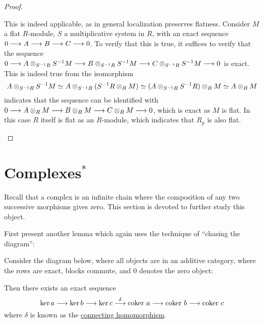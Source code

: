 \begin{proof}
\begin{enumerate}
        This is indeed applicable, as in general localization preserves flatness. Consider $M$ a flat $R$-module, $S$ a multiplicative system in $R$, with an exact sequence $0 \longrightarrow A \longrightarrow B \longrightarrow C \longrightarrow 0$. To verify that this is true, it suffices to verify that the sequence $0 \longrightarrow A \otimes_{S^{-1}R} S^{-1}M \longrightarrow B \otimes_{S^{-1}R} S^{-1}M \longrightarrow C \otimes_{S^{-1}R} S^{-1}M \longrightarrow 0$ is exact. This is indeed true from the isomorphism 
        \[
            A \otimes_{S^{-1}R} S^{-1}M \simeq A \otimes_{S^{-1}R} (S^{-1}R \otimes_R M) \simeq (A \otimes_{S^{-1}R} S^{-1}R) \otimes_R M \simeq A \otimes_R M
        \]
        indicates that the sequence can be identified with $0 \longrightarrow A \otimes_R M \longrightarrow B \otimes_R M \longrightarrow C \otimes_R M \longrightarrow 0$, which is exact as $M$ is flat. In this case $R$ itself is flat as an $R$-module, which indicates that $R_p$ is also flat.
    \end{enumerate}

\end{proof}

\section{Complexes$^*$}

Recall that a complex is an infinite chain where the composition of any two successive morphisms gives zero. This section is devoted to further study this object.

First present another lemma which again uses the technique of ``chasing the diagram'':

\begin{proposition}
    Consider the diagram below, where all objects are in an additive category, where the rows are exact, blocks commute, and $0$ denotes the zero object: 
    \begin{figure}[htbp]
        \centering
    \end{figure}

    Then there exists an exact sequence
    \[
        \ker a \longrightarrow \ker b \longrightarrow \ker c \overset{\delta}{\longrightarrow} \mathrm{coker}\  a \longrightarrow \mathrm{coker}\  b \longrightarrow \mathrm{coker}\  c
    \]
    where $\delta$ is known as the \underline{connecting homomorphism}.
\end{proposition}

